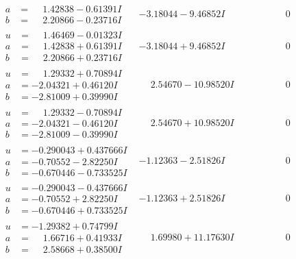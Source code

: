 \documentclass[1p]{elsarticle_modified}
\theoremstyle{definition}
\begin{document}
$$\begin{array}{c|c|c}
\begin{aligned}
a &= \phantom{-}1.42838 - 0.61391 I \\
b &= \phantom{-}2.20866 - 0.23716 I\end{aligned}
 & -3.18044 - 9.46852 I & \phantom{-0.000000 } 0 \\ \hline\begin{aligned}
u &= \phantom{-}1.46469 - 0.01323 I \\
a &= \phantom{-}1.42838 + 0.61391 I \\
b &= \phantom{-}2.20866 + 0.23716 I\end{aligned}
 & -3.18044 + 9.46852 I & \phantom{-0.000000 } 0 \\ \hline\begin{aligned}
u &= \phantom{-}1.29332 + 0.70894 I \\
a &= -2.04321 + 0.46120 I \\
b &= -2.81009 + 0.39990 I\end{aligned}
 & \phantom{-}2.54670 - 10.98520 I & \phantom{-0.000000 } 0 \\ \hline\begin{aligned}
u &= \phantom{-}1.29332 - 0.70894 I \\
a &= -2.04321 - 0.46120 I \\
b &= -2.81009 - 0.39990 I\end{aligned}
 & \phantom{-}2.54670 + 10.98520 I & \phantom{-0.000000 } 0 \\ \hline\begin{aligned}
u &= -0.290043 + 0.437666 I \\
a &= -0.70552 - 2.82250 I \\
b &= -0.670446 - 0.733525 I\end{aligned}
 & -1.12363 - 2.51826 I & \phantom{-0.000000 } 0 \\ \hline\begin{aligned}
u &= -0.290043 - 0.437666 I \\
a &= -0.70552 + 2.82250 I \\
b &= -0.670446 + 0.733525 I\end{aligned}
 & -1.12363 + 2.51826 I & \phantom{-0.000000 } 0 \\ \hline\begin{aligned}
u &= -1.29382 + 0.74799 I \\
a &= \phantom{-}1.66716 + 0.41933 I \\
b &= \phantom{-}2.58668 + 0.38500 I\end{aligned}
 & \phantom{-}1.69980 + 11.17630 I & \phantom{-0.000000 } 0 \\ \hline\begin{aligned}

\end{aligned}
\end{array}$$
\end{document}
